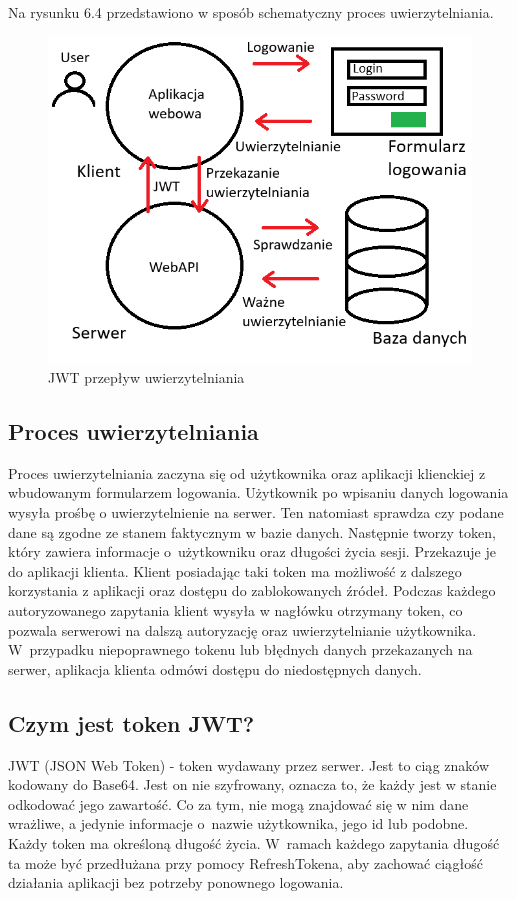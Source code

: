 \documentclass[a4paper,twoside,12pt]{book}
\begin{document}
Na rysunku 6.4 przedstawiono w sposób schematyczny proces uwierzytelniania.
\begin{figure}[H]
    \centering
    \includegraphics[width=1\textwidth]{jwt.png}
    \caption{JWT przepływ uwierzytelniania}
    \label{JWT}
\end{figure}

\subsection{Proces uwierzytelniania} 
Proces uwierzytelniania zaczyna się od użytkownika oraz aplikacji klienckiej z wbudowanym formularzem logowania. Użytkownik po wpisaniu danych logowania wysyła prośbę o uwierzytelnienie na serwer. Ten natomiast sprawdza czy podane dane są zgodne ze stanem faktycznym w bazie danych. Następnie tworzy token, który zawiera informacje o~użytkowniku oraz długości życia sesji. Przekazuje je do aplikacji klienta. Klient posiadając taki token ma możliwość z dalszego korzystania z aplikacji oraz dostępu do zablokowanych źródeł. Podczas każdego autoryzowanego zapytania klient wysyła w nagłówku otrzymany token, co pozwala serwerowi na dalszą autoryzację oraz uwierzytelnianie użytkownika. W~przypadku niepoprawnego tokenu lub błędnych danych przekazanych na serwer, aplikacja klienta odmówi dostępu do niedostępnych danych. 

\subsection{Czym jest token JWT?} 
JWT (JSON Web Token) - token wydawany przez serwer. Jest to ciąg znaków kodowany do Base64. Jest on nie szyfrowany, oznacza to, że każdy jest w stanie odkodować jego zawartość. Co za tym, nie mogą znajdować się w nim dane wrażliwe, a jedynie informacje o~nazwie użytkownika, jego id lub podobne. Każdy token ma określoną długość życia. W~ramach każdego zapytania długość ta może być przedłużana przy pomocy RefreshTokena, aby zachować ciągłość działania aplikacji bez potrzeby ponownego logowania. 
\end{document}
